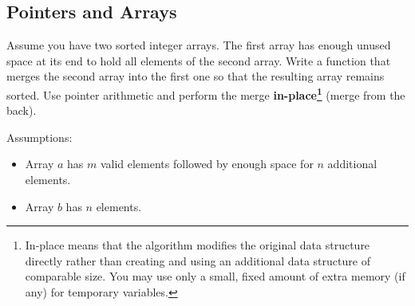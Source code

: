 \documentclass{article}
\begin{document}
\subsection{Pointers and Arrays}

Assume you have two sorted integer arrays. The first array has enough unused space at its end to hold all elements of the second array. Write a function that merges the second array into the first one so that the resulting array remains sorted. Use pointer arithmetic and perform the merge \textbf{in-place\footnote{In-place means that the algorithm modifies the original data structure directly rather than creating and using an additional data structure of comparable size. You may use only a small, fixed amount of extra memory (if any) for temporary variables.}} (merge from the back).

Assumptions:
\begin{itemize}

\item Array $a$ has $m$ valid elements followed by enough space for $n$ additional elements.
    
\item Array $b$ has $n$ elements.    
        \end{itemize}  
        
\end{document}

